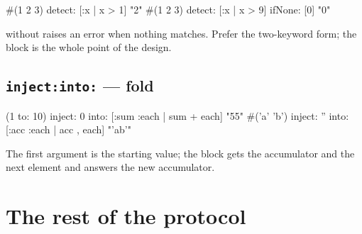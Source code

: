 \begin{st}
#(1 2 3) detect: [:x | x > 1]                "2"
#(1 2 3) detect: [:x | x > 9] ifNone: [0]    "0"
\end{st}

 without  raises an error when nothing matches. Prefer
the two-keyword form; the block is the whole point of the design.

\subsection{\texttt{inject:into:} --- fold}

\begin{st}
(1 to: 10) inject: 0 into: [:sum :each | sum + each]      "55"
#('a' 'b') inject: '' into: [:acc :each | acc , each]     "'ab'"
\end{st}

The first argument is the starting value; the block gets the accumulator and
the next element and answers the new accumulator.

\section{The rest of the protocol}

